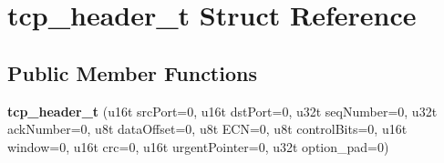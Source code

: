 \hypertarget{structtcp__header__t}{}\section{tcp\+\_\+header\+\_\+t Struct Reference}
\label{structtcp__header__t}
\subsection*{Public Member Functions}
\begin{DoxyCompactItemize}
\item 
\mbox{\label{structtcp__header__t_a8059c930a72b7fa280e74c72425c4a2f}} 
{\bfseries tcp\+\_\+header\+\_\+t} (u16t src\+Port=0, u16t dst\+Port=0, u32t seq\+Number=0, u32t ack\+Number=0, u8t data\+Offset=0, u8t E\+CN=0, u8t control\+Bits=0, u16t window=0, u16t crc=0, u16t urgent\+Pointer=0, u32t option\+\_\+pad=0)
\end{DoxyCompactItemize}
